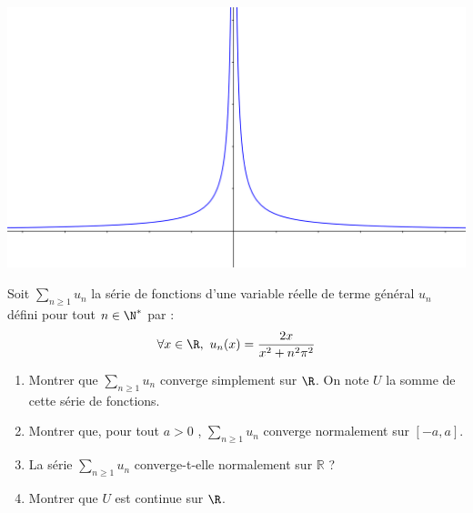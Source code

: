 \documentclass[a4paper,10pt]{report}
\newcommand{\Sum}[2]{\ensuremath{\textstyle{\sum\limits_{#1}^{#2}}}}
\begin{document}
\begin{enumerate}
\begin{center}
\includegraphics[scale=0.4]{allure}
\end{center}
\end{enumerate}

\medskip


\begin{Exercice}{}  Soit $\Sum{n \geq 1}{} u_n$ la s\'erie de fonctions d'une variable r\'eelle de terme g\'en\'eral $u_n$ d\'efini pour tout $n \in \N^*$ par : 
$$ \forall x \in \R ,\ u_n(x)=\dfrac{2x}{x^2+n^2\pi^2}$$
\begin{enumerate}
\item Montrer que $\Sum{n \geq 1}{} u_n$ converge simplement sur $\R$. On note $U$ la somme de cette  s\'erie de fonctions.
\item Montrer que, pour tout $a > 0$ , $\Sum{n \geq 1}{} u_n$ converge normalement sur $[-a,a]$.
\item La s\'erie $\Sum{n \geq 1}{} u_n$ converge-t-elle normalement sur $\mathbb{R}$ ?
\item Montrer que $U$ est continue sur $\R$.
\end{enumerate}
\end{Exercice}
\end{document}
